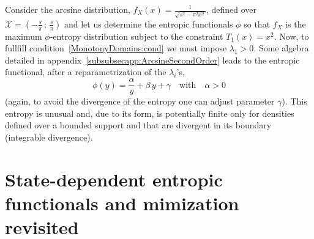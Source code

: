 \documentclass[entropy,article,submit,moreauthors,pdftex]{Definitions/mdpi}
\newcounter{arcsineExample}%
\newcommand{\SZ}[1]{{\color{blue} #1}}                                       %
\def\X{\mathcal{X}}%
\begin{document}
%
\begin{Example}\label{arcsine:ex}\setcounter{arcsineExample}{\value{example}}
   Consider the  arcsine distribution, \SZ{$f_X(x) =  \frac{1}{\sqrt{s^2 - \pi^2
         x^2}}$, defined over $\X =  \left( -\frac{s}{\pi} \, ; \, \frac{s}{\pi}
     \right)$}  and let  us determine  the entropic  functionals $\phi$  so that
   $f_X$ is  the maximum $\phi$-entropy  distribution subject to  the constraint
   $T_1(x)  = x^2$.   Now, to  fullfill condition~\ref{MonotonyDomains:cond}  we
   must   impose    $\lambda_1   >    0$.    Some   algebra    \SZ{detailed   in
     appendix~\ref{subsubsecapp:ArcsineSecondOrder}}   leads  to   the  entropic
   functional,  after  a reparametrization  of  the  $\lambda_i$'s, $$\phi(y)  =
   \frac{\alpha}{y} + \beta  \, y + \gamma \quad \mbox{with}  \quad \alpha > 0$$
   \SZ{(again, to avoid  the divergence of the entropy one  can adjust parameter
     $\gamma$).} This  entropy is unusual and,  due to its form,  is potentially
   finite  only for  densities  defined  over a  bounded  support  and that  are
   divergent in its boundary (integrable divergence).
\end{Example}




\section{State-dependent entropic functionals and mimization revisited}
\label{sec:MultiformEnt}
\end{document}
